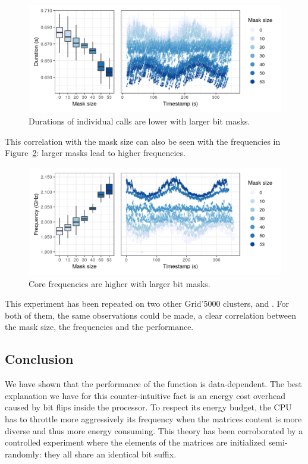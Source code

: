             \begin{figure}[htbp]
                \centering
                \includegraphics[width=\linewidth]{img/experiment/bit-flips/mask_size_perf.png}
                \caption{\label{fig:exp:bit-flips:mask-perf}
                Durations of individual \dgemm calls are lower with larger bit masks.}
            \end{figure}

            This correlation with the mask size can also be seen with the frequencies in
            Figure~\ref{fig:exp:bit-flips:mask-freq}: larger masks lead to higher frequencies.

            \begin{figure}[htbp]
                \centering
                \includegraphics[width=\linewidth]{img/experiment/bit-flips/mask_size_freq.png}
                \caption{\label{fig:exp:bit-flips:mask-freq}
                Core frequencies are higher with larger bit masks.}
            \end{figure}

            This experiment has been repeated on two other Grid'5000 clusters, \ecotype and \gros. For both of them, the
            same observations could be made, a clear correlation between the mask size, the frequencies and the
            performance.

        \subsection{Conclusion}
            We have shown that the performance of the \dgemm function is data-dependent. The best explanation we
            have for this counter-intuitive fact is an energy cost overhead caused by bit flips inside the processor.
            To respect its energy budget, the CPU has to throttle more aggressively its frequency when the matrices
            content is more diverse and thus more energy consuming.
            This theory has been corroborated by a controlled experiment where the elements of the matrices are
            initialized semi-randomly: they all share an identical bit suffix.

